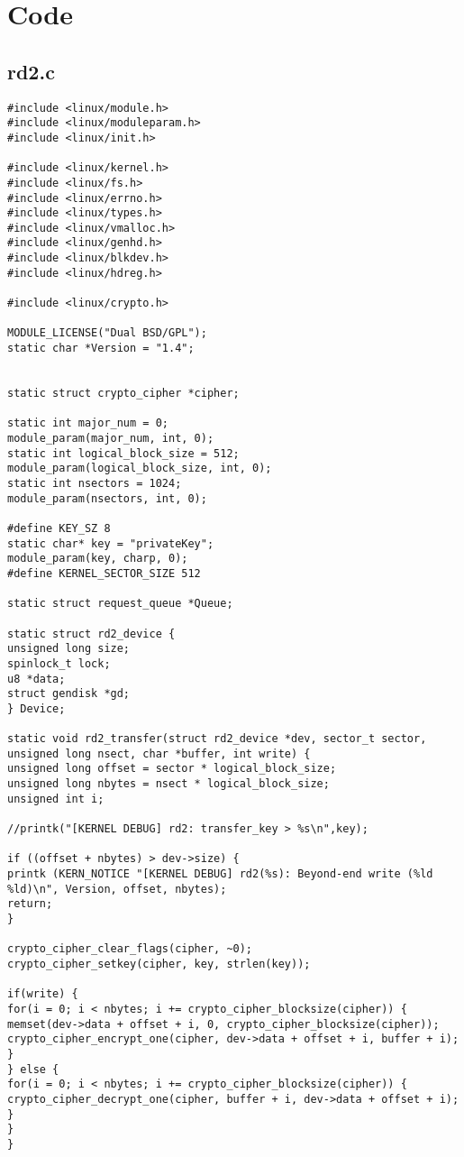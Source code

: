 \documentclass[journal,10pt,onecolumn,compsoc,letterpaper,draftclsnofoot,table,xcdraw]{IEEEtran} \usepackage[margin=0.75in]{geometry}
\begin{document}
\section{Code}
\subsection{rd2.c}
\begin{verbatim}
#include <linux/module.h>
#include <linux/moduleparam.h>
#include <linux/init.h>

#include <linux/kernel.h>
#include <linux/fs.h>
#include <linux/errno.h>
#include <linux/types.h>
#include <linux/vmalloc.h>
#include <linux/genhd.h>
#include <linux/blkdev.h>
#include <linux/hdreg.h>

#include <linux/crypto.h>

MODULE_LICENSE("Dual BSD/GPL");
static char *Version = "1.4";


static struct crypto_cipher *cipher;

static int major_num = 0;
module_param(major_num, int, 0);
static int logical_block_size = 512;
module_param(logical_block_size, int, 0);
static int nsectors = 1024;
module_param(nsectors, int, 0);

#define KEY_SZ 8
static char* key = "privateKey";
module_param(key, charp, 0);
#define KERNEL_SECTOR_SIZE 512

static struct request_queue *Queue;

static struct rd2_device {
unsigned long size;
spinlock_t lock;
u8 *data;
struct gendisk *gd;
} Device;

static void rd2_transfer(struct rd2_device *dev, sector_t sector,
unsigned long nsect, char *buffer, int write) {
unsigned long offset = sector * logical_block_size;
unsigned long nbytes = nsect * logical_block_size;
unsigned int i;

//printk("[KERNEL DEBUG] rd2: transfer_key > %s\n",key);

if ((offset + nbytes) > dev->size) {
printk (KERN_NOTICE "[KERNEL DEBUG] rd2(%s): Beyond-end write (%ld %ld)\n", Version, offset, nbytes);
return;
}

crypto_cipher_clear_flags(cipher, ~0);
crypto_cipher_setkey(cipher, key, strlen(key));

if(write) {
for(i = 0; i < nbytes; i += crypto_cipher_blocksize(cipher)) {
memset(dev->data + offset + i, 0, crypto_cipher_blocksize(cipher));
crypto_cipher_encrypt_one(cipher, dev->data + offset + i, buffer + i);
}
} else {
for(i = 0; i < nbytes; i += crypto_cipher_blocksize(cipher)) {
crypto_cipher_decrypt_one(cipher, buffer + i, dev->data + offset + i);
}
}
}


\end{verbatim}
\end{document}
